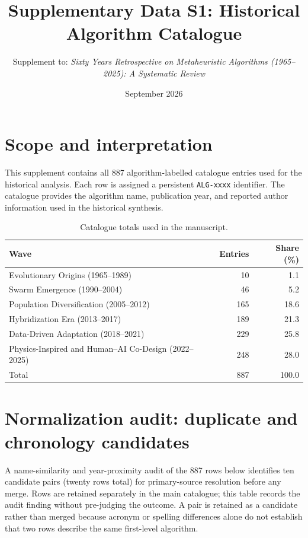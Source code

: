 \documentclass[8pt]{article}
\title{Supplementary Data S1: Historical Algorithm Catalogue}
\author{Supplement to: \textit{Sixty Years Retrospective on Metaheuristic Algorithms (1965--2025): A Systematic Review}}
\date{September 2026}
\begin{document}
\maketitle
\section*{Scope and interpretation}
This supplement contains all 887 algorithm-labelled catalogue entries used for the historical analysis. Each row is assigned a persistent \texttt{ALG-xxxx} identifier. The catalogue provides the algorithm name, publication year, and reported author information used in the historical synthesis.

\begin{table}[h]
\centering
\caption{Catalogue totals used in the manuscript.}
\begin{tabular}{lrr}
\toprule
Wave & Entries & Share (\%)\\
\midrule
Evolutionary Origins (1965--1989) & 10 & 1.1\\
Swarm Emergence (1990--2004) & 46 & 5.2\\
Population Diversification (2005--2012) & 165 & 18.6\\
Hybridization Era (2013--2017) & 189 & 21.3\\
Data-Driven Adaptation (2018--2021) & 229 & 25.8\\
Physics-Inspired and Human--AI Co-Design (2022--2025) & 248 & 28.0\\
\midrule
Total & 887 & 100.0\\
\bottomrule
\end{tabular}
\end{table}

\section*{Normalization audit: duplicate and chronology candidates}
A name-similarity and year-proximity audit of the 887 rows below identifies ten candidate pairs (twenty rows total) for primary-source resolution before any merge. Rows are retained separately in the main catalogue; this table records the audit finding without pre-judging the outcome. A pair is retained as a candidate rather than merged because acronym or spelling differences alone do not establish that two rows describe the same first-level algorithm.
\end{document}
